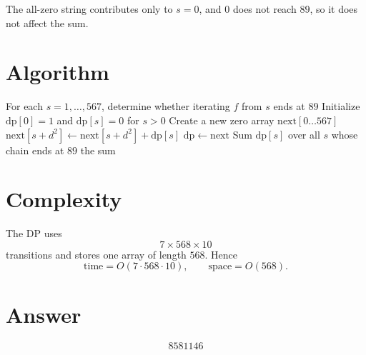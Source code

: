 \documentclass[12pt]{article}
\begin{document}
The all-zero string contributes only to $s=0$, and $0$ does not reach $89$, so it does not affect the sum.

\section{Algorithm}

\begin{algorithm}[H]
\caption{Count starting values below $10^7$ that end at $89$}
\begin{algorithmic}[1]
\STATE For each $s=1,\dots,567$, determine whether iterating $f$ from $s$ ends at $89$
\STATE Initialize $\mathrm{dp}[0]=1$ and $\mathrm{dp}[s]=0$ for $s>0$
    \STATE Create a new zero array $\mathrm{next}[0\ldots 567]$
            \STATE $\mathrm{next}[s+d^2] \gets \mathrm{next}[s+d^2] + \mathrm{dp}[s]$
        \ENDFOR
    \ENDFOR
    \STATE $\mathrm{dp}\gets \mathrm{next}$
\ENDFOR
\STATE Sum $\mathrm{dp}[s]$ over all $s$ whose chain ends at $89$
\RETURN the sum
\end{algorithmic}
\end{algorithm}

\section{Complexity}

The DP uses
\[
7\times 568\times 10
\]
transitions and stores one array of length $568$. Hence
\[
\text{time}=O(7\cdot 568\cdot 10),\qquad \text{space}=O(568).
\]

\section{Answer}

\[
\boxed{8581146}
\]
\end{document}
